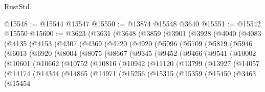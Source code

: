 \begin{lexlean}{RustStd}
\begin{coremodule}
@15548 := @15544 @15547
@15550 := @13874 @15548 @3640
@15551 := @15542 @15550
@15600 := @3623
    (@3631
      (@3648
        (@3859
          (@3901
            (@3928
              (@4040
                (@4083
                  (@4135
                    (@4153
                      (@4307
                        (@4369
                          (@4720
                            (@4920
                              (@5096
                                (@5709
                                  (@5819
                                    (@5946
                                      (@6013
                                        (@6920
                                          (@8004
                                            (@8075
                                              (@8667
                                                (@9345
                                                  (@9452
                                                    (@9466
                                                      (@9541
                                                        (@10002
                                                          (@10601
                                                            (@10662
                                                              (@10752
                                                                (@10816
                                                                  (@10942
                                                                    (@11120
                                                                      (@13799
                                                                        (@13927
                                                                          (@14057
                                                                            (@14174
                                                                              (@14344
                                                                                (@14865
                                                                                  (@14971
                                                                                    (@15256
                                                                                      (@15315
                                                                                        (@15359
                                                                                          (@15450
                                                                                            (@3463
                                                                                              (@15454

\end{coremodule}
\end{lexlean}
